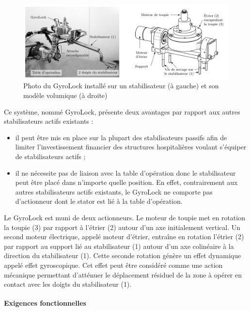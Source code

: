 \begin{figure}[ht]
\begin{center}
\includegraphics[width=0.8\linewidth]{img/fig02}
\caption{Photo du GyroLock installé sur un stabilisateur (à gauche) et son modèle volumique (à droite) }
\label{fig02}
\end{center}
\end{figure} 

\newpage

Ce système, nommé GyroLock, présente deux avantages par rapport aux autres stabilisateurs actifs existants : 
\begin{itemize}
 \item il peut être mis en place sur la plupart des stabilisateurs passifs afin de limiter l'investissement financier des structures hospitalières voulant s'équiper de stabilisateurs actifs ; 
 \item il ne nécessite pas de liaison avec la table d'opération donc le stabilisateur peut être placé dans n'importe quelle position. En effet, contrairement aux autres stabilisateurs actifs existants, le GyroLock ne comporte pas d'actionneur dont le stator est lié à la table d'opération.
\end{itemize}
 
Le GyroLock est muni de deux actionneurs. Le moteur de toupie met en rotation la toupie (3) par rapport à l'étrier (2) autour d'un axe initialement vertical. Un second moteur électrique, appelé moteur d'étrier, entraîne en rotation l'étrier (2) par rapport au support lié au stabilisateur (1) autour d'un axe colinéaire à la direction du stabilisateur (1). Cette seconde rotation génère un effet dynamique appelé effet gyroscopique. Cet effet peut être considéré comme une action mécanique permettant d'atténuer le déplacement résiduel de la zone à opérer en contact avec les doigts du stabilisateur (1). 

\paragraph{Exigences fonctionnelles} ~\ \\

